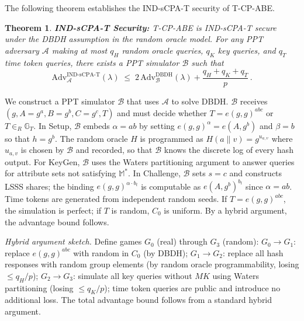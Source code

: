 ﻿\documentclass[lettersize,journal]{IEEEtran}
\makeatletter
\renewcommand{\proofname}{\bfseries Proof}
\renewenvironment{proof}[1][\proofname]{\par
  \pushQED{\qed}%
  \normalfont \topsep6\p@\@plus6\p@\relax
  \trivlist
  \item[\hskip\labelsep
        \itshape
  #1\@addpunct{:}]\ignorespaces
}{%
  \popQED\endtrivlist\@endpefalse
}
\newtheorem{theorem}{Theorem}
\makeatother
\begin{document}
The following theorem establishes the IND-sCPA-T security of T-CP-ABE.

\begin{theorem}
\label{thm:indscpat}
\textbf{IND-sCPA-T Security:}
T-CP-ABE is IND-sCPA-T secure under the DBDH assumption in the random oracle
model. For any PPT adversary $\mathcal{A}$ making at most $q_H$ random oracle
queries, $q_K$ key queries, and $q_T$ time token queries, there exists a PPT
simulator $\mathcal{B}$ such that
\begin{equation}
    \text{Adv}_{\mathcal{A}}^{\text{IND-sCPA-T}}(\lambda)
    \;\leq\;
    2\,\text{Adv}_{\mathcal{B}}^{\text{DBDH}}(\lambda)
    + \frac{q_H + q_K + q_T}{p}\,.
    \label{eq:security_bound}
\end{equation}
\end{theorem}

\begin{proof}
We construct a PPT simulator $\mathcal{B}$ that uses $\mathcal{A}$ to
solve DBDH. $\mathcal{B}$ receives $(g, A\!=\!g^a, B\!=\!g^b,
C\!=\!g^c, T)$ and must decide whether $T =
e(g,g)^{abc}$ or $T \in_R \mathbb{G}_T$.
In Setup, $\mathcal{B}$ embeds $\alpha = ab$ by setting $e(g,g)^\alpha
= e(A, g^b)$ and $\beta = b$ so that $h = g^b$.  The random oracle $H$
is programmed as $H(a\|v) = g^{u_{a,v}}$ where $u_{a,v}$ is chosen
by $\mathcal{B}$ and recorded, so that $\mathcal{B}$ knows the discrete
log of every hash output.  For KeyGen, $\mathcal{B}$
uses the Waters partitioning argument to answer queries
for attribute sets not satisfying $\mathbb{M}^*$. In Challenge,
$\mathcal{B}$ sets $s = c$ and constructs LSSS shares; the binding
$e(g,g)^{\alpha \cdot b_t}$ is computable as $e(A,g^b)^{b_t}$ since
$\alpha = ab$. Time tokens are generated from independent random seeds.
If $T = e(g,g)^{abc}$, the simulation is perfect; if $T$ is random,
$C_0$ is uniform. By a hybrid argument, the advantage bound follows.
\end{proof}

\textit{Hybrid argument sketch.}
Define games $G_0$ (real) through $G_3$ (random):
$G_0 \to G_1$: replace $e(g,g)^{abc}$ with random in $C_0$ (by DBDH);
$G_1 \to G_2$: replace all hash responses with random group elements
(by random oracle programmability, losing $\leq q_H/p$);
$G_2 \to G_3$: simulate all key queries without $MK$ using Waters
partitioning (losing $\leq q_K/p$); time token queries are public
and introduce no additional loss. The total advantage bound follows
from a standard hybrid argument.
\end{document}
